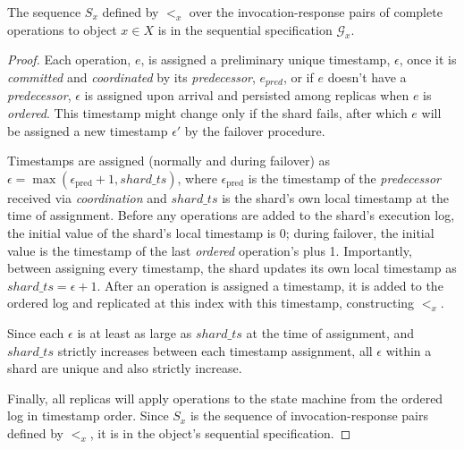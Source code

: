 \begin{lem}
    \label{lemmaD8}
    The sequence $S_x$ defined by $<_x$ over the invocation-response pairs of complete operations to object $x \in X$ is in the sequential specification $\mathcal{G}_x$.
\end{lem}
\begin{proof}
    Each operation, $e$, is assigned a preliminary unique timestamp, $\epsilon$, once it is \textit{committed} and \textit{coordinated} by its \textit{predecessor}, $e_{pred}$, or if $e$ doesn't have a \textit{predecessor}, $\epsilon$ is assigned upon arrival and persisted among replicas when $e$ is \textit{ordered}. This timestamp might change only if the shard fails, after which $e$ will be assigned a new timestamp $\epsilon'$ by the failover procedure.
    
    Timestamps are assigned (normally and during failover) as $\epsilon = \max(\epsilon_\text{pred}+1, shard\_ts)$, where $\epsilon_\text{pred}$ is the timestamp of the \textit{predecessor} received via \textit{coordination} and $shard\_ts$ is the shard's own local timestamp at the time of assignment. Before any operations are added to the shard's execution log, the initial value of the shard's local timestamp is $0$; during failover, the initial value is the timestamp of the last \textit{ordered} operation's plus 1. Importantly, between assigning every timestamp, the shard updates its own local timestamp as $shard\_ts = \epsilon + 1$. After an operation is assigned a timestamp, it is added to the ordered log and replicated at this index with this timestamp, constructing $<_x$.

    Since each $\epsilon$ is at least as large as $shard\_ts$ at the time of assignment, and $shard\_ts$ strictly increases between each timestamp assignment, all $\epsilon$ within a shard are unique and also strictly increase.

    Finally, all replicas will apply operations to the state machine from the ordered log in timestamp order. Since $S_x$ is the sequence of invocation-response pairs defined by $<_x$, it is in the object's sequential specification.
\end{proof}



